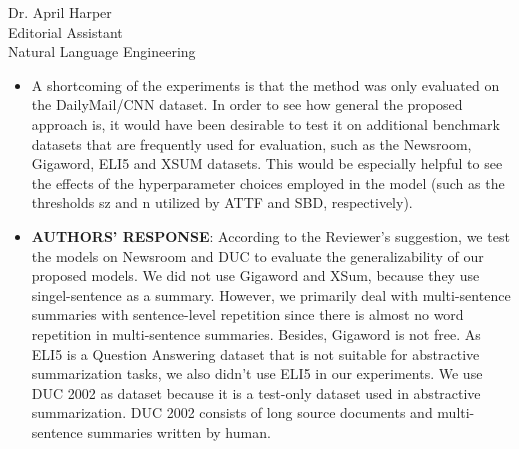 \documentclass[11pt]{letter} %
\theoremstyle{definition}
\begin{document}
\begin{letter}{Dr. April Harper \\
            Editorial Assistant \\
			Natural Language Engineering}
\begin{enumerate}
\begin{itemize}
                We compared our proposed models with DivCNN Seq2seq 
                in terms of ROUGE scores, repeatedness and readability.
                We updated the Table 7 and Table 8 by filling in the scores of DivCNN,
                and analyzed the experimental results (Section 3.4).
                Our proposed model (ATTF+SBD) outperforms DivCNN on all evaluation metrics.
                Compared with ATTF+SBD, DivCNN adjusts attention distribution in an indirect manner that adds the attention of the subsets (with hight quality-diversity-score) selected from source document into the loss. So, DivCBNN may still attend to similar but different sentences, resulting in lower ROUGE scores and higher repeatedness. As DivCNN is trained to attend to diversity subsets, 
                which means that the selected subsets are more scattered (shown in Figure ) and leads to semantic incoherence. Thus, the readability score of DivCNN is lower.
                              
				\item A shortcoming of the experiments is that the method was only evaluated on the DailyMail/CNN dataset. In order to see how general the proposed approach is, it would have been desirable to test it on additional benchmark datasets that are frequently used for evaluation, such as the Newsroom, Gigaword, ELI5 and XSUM datasets. This would be especially helpful to see the effects of the hyperparameter choices employed in the model (such as the thresholds sz and n utilized by ATTF and SBD, respectively).
				\item[] \textbf{AUTHORS' RESPONSE}:  
                According to the Reviewer's suggestion, we test the models on Newsroom and DUC to evaluate the generalizability of our proposed models.
                We did not use Gigaword and XSum, because they use singel-sentence as a summary.  
                However, we primarily deal with multi-sentence summaries with 
                sentence-level repetition since there is almost no word repetition in multi-sentence summaries. Besides, Gigaword is not free.
                As ELI5 is a Question Answering dataset that is not suitable for abstractive summarization tasks, we also didn't use ELI5 in our experiments.
                We use DUC 2002 as dataset because it is a test-only dataset used in abstractive summarization. DUC 2002 consists of long source documents and multi-sentence summaries written by human.
                

\end{itemize}
\end{enumerate}
\end{letter}
\end{document}
